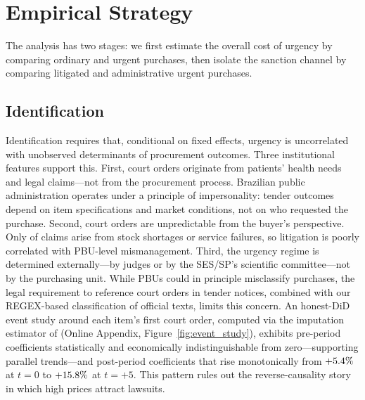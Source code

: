 \section{Empirical Strategy}
\label{sec:empirical}

The analysis has two stages: we first estimate the overall cost of urgency by comparing ordinary and urgent purchases, then isolate the sanction channel by comparing litigated and administrative urgent purchases.

\subsection{Identification}

Identification requires that, conditional on fixed effects, urgency is uncorrelated with unobserved determinants of procurement outcomes. Three institutional features support this. First, court orders originate from patients' health needs and legal claims---not from the procurement process. Brazilian public administration operates under a principle of impersonality: tender outcomes depend on item specifications and market conditions, not on who requested the purchase. Second, court orders are unpredictable from the buyer's perspective. Only \BPstockShortageShare{} of claims arise from stock shortages or service failures, so litigation is poorly correlated with PBU-level mismanagement. Third, the urgency regime is determined externally---by judges or by the SES/SP's scientific committee---not by the purchasing unit. While PBUs could in principle misclassify purchases, the legal requirement to reference court orders in tender notices, combined with our REGEX-based classification of official texts, limits this concern. An honest-DiD event study around each item's first court order, computed via the imputation estimator of \citet{borusyak2024revisiting} (Online Appendix, Figure~\ref{fig:event_study}), exhibits pre-period coefficients statistically and economically indistinguishable from zero---supporting parallel trends---and post-period coefficients that rise monotonically from $+5.4\%$ at $t=0$ to $+15.8\%$ at $t=+5$. This pattern rules out the reverse-causality story in which high prices attract lawsuits.


